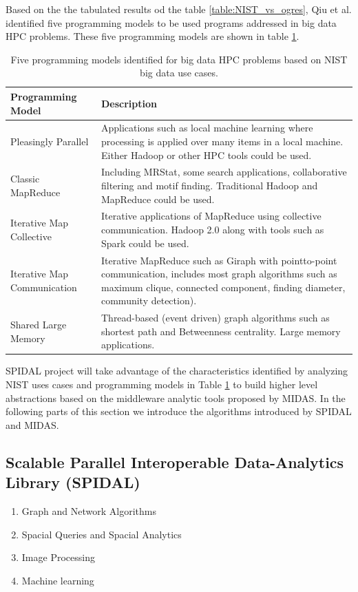 \documentclass[runningheads,a4paper]{llncs}
\begin{document}
Based on the the tabulated results od the table \ref{table:NIST_vs_ogres}, Qiu et al. \cite{Qiu2014} identified five programming models to be used programs addressed in big data HPC problems. These five programming models are shown in table \ref{table:NIST_5_Programming_model}.
\begin{table}
	\centering
	\caption{Five programming models identified for big data HPC problems based on NIST big data use cases.}
	\begin{tabular}{ |p{4cm}|p{7cm}|  }
		\hline
		\textbf{Programming Model} & \textbf{Description} \\
		\hline
		Pleasingly Parallel & Applications such as local machine learning where processing is applied over many items in a local machine. Either Hadoop or other HPC tools could be used. \\
		\hline
		Classic MapReduce & Including MRStat, some search applications, collaborative filtering and motif finding. Traditional Hadoop and MapReduce could be used.\\
		\hline
		Iterative Map Collective & Iterative applications of MapReduce using collective communication. Hadoop 2.0 along with tools such as Spark could be used.\\
		\hline
		Iterative Map Communication & Iterative MapReduce such as Giraph with pointto-point
		communication, includes most graph algorithms
		such as maximum clique, connected
		component, finding diameter, community detection).
		 \\
		\hline
		Shared Large Memory & Thread-based (event driven) graph algorithms
		such as shortest path and Betweenness centrality.
		Large memory applications.\\
		\hline
		
	\end{tabular}
	\label{table:NIST_5_Programming_model}
\end{table}

SPIDAL project will take advantage of the characteristics identified by analyzing NIST uses cases and programming models in Table \ref{table:NIST_5_Programming_model} to build higher level abstractions based on the middleware analytic tools proposed by MIDAS. In the following parts of this section we introduce the algorithms introduced by SPIDAL and MIDAS.
\subsection*{Scalable Parallel Interoperable Data-Analytics Library (SPIDAL) }
\begin{enumerate}
	\item Graph and Network Algorithms
	\item Spacial Queries and Spacial Analytics
	\item Image Processing
	\item Machine learning
\end{enumerate}
\end{document}
